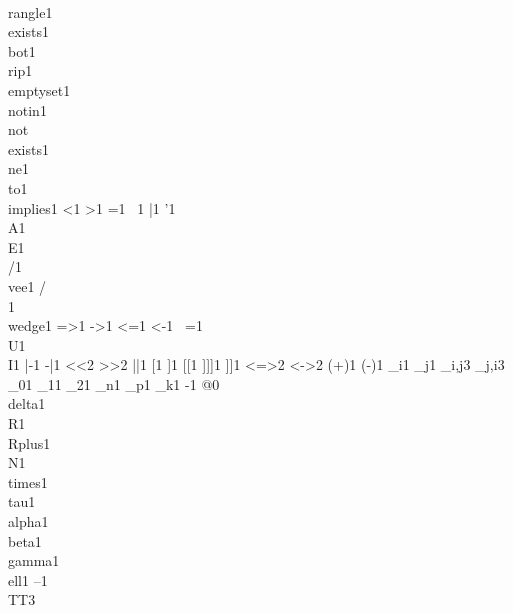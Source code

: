 {{{        {\\rangle}{{}}1
        {\\exists}{{}}1
        {\\bot}{{}}1
        {\\rip}{{}}1
        {\\emptyset}{{}}1
        {\\notin}{{}}1
        {\\not\\exists}{{}}1
        {\\ne}{{}}1
        {\\to}{{}}1
        {\\implies}{{}}1
{<}{{}}1
        {>}{{}}1
        {=}{{}}1
        {~}{{}}1
        {|}{{}}1
        {'}{{}}1
{\\A}{{}}1
        {\\E}{{}}1
        {\\/}{{}}1
        {\\vee}{{}}1
        {/\\}{{}}1
        {\\wedge}{{}}1
        {=>}{{}}1
        {->}{{}}1
        {<=}{{}}1
        {<-}{{}}1
{~=}{{}}1
        {\\U}{{}}1
        {\\I}{{}}1
        {|-}{{}}1
        {-|}{{}}1
        {<<}{{}}2
        {>>}{{}}2
        {||}{{}}1
{[}{{}}1
        {]}{{}}1
        {[[}{{}}1
        {]]]}{{}}1
        {]]}{{}}1
        {<=>}{{}}2
        {<->}{{}}2
        {(+)}{{}}1
        {(-)}{{}}1
        {_i}{{}}1
        {_j}{{}}1
        {_{i,j}}{{}}3
        {_{j,i}}{{}}3
        {_0}{{}}1
        {_1}{{}}1
        {_2}{{}}1
        {_n}{{}}1
        {_p}{{}}1
        {_k}{{}}1
        {-}{{}}1
        {@}{{}}0
        {\\delta}{{}}1
        {\\R}{{}}1
        {\\Rplus}{{}}1
        {\\N}{{}}1
        {\\times}{{}}1
        {\\tau}{{}}1
        {\\alpha}{{}}1
        {\\beta}{{}}1
        {\\gamma}{{}}1
        {\\ell}{{}}1
        {--}{{}}1
        {\\TT}{{\hspace{1.5em}}}3
      }

}}
